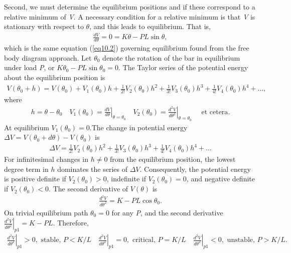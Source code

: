 \documentclass{AeroStructure-ERJohnson}
\begin{document}
\vspace*{-1pc}

Second, we must determine the equilibrium positions and if these correspond to a relative minimum of \textit{V}. A necessary condition for a relative minimum is that \textit{V} is stationary with respect to $\theta$, and this leads to equilibrium. That is,
\begin{align}\label{eq10.28}
\frac{d V}{d \theta}=0=K \theta-P L \sin \theta,
\end{align}
which is the same equation (\ref{eq10.2}) governing equilibrium found from the free body diagram approach. Let $\theta_{0}$ denote the rotation of the bar in equilibrium under load \textit{P}, or $K \theta_{0}-P L \sin \theta_{0}=0$. The Taylor series of the potential energy about the equilibrium position is
\begin{align}\label{eq10.29}
V\left(\theta_{0}+h\right)=V\left(\theta_{0}\right)+V_{1}\left(\theta_{0}\right) h+\frac{1}{2 !} V_{2}\left(\theta_{0}\right) h^{2}+\frac{1}{3 !} V_{3}\left(\theta_{0}\right) h^{3}+\frac{1}{4 !} V_{4}\left(\theta_{0}\right) h^{4}+\ldots,
\end{align}
where
\begin{align}\label{eq10.30}
h=\theta-\theta_{0} \quad V_{1}\left(\theta_{0}\right)=\left.\frac{d V}{d \theta}\right|_{\theta = \theta_{0}} \quad V_{2}\left(\theta_{0}\right)=\left.\frac{d^{2} V}{d \theta^{2}}\right|_{\theta = \theta_{0}} \quad \text { et cetera}.
\end{align}
At equilibrium $V_{1}\left(\theta_{0}\right)=0$.The change in potential energy $\Delta V=V\left(\theta_{0}+d \theta\right)-V\left(\theta_{0}\right)$ is
\begin{align}\label{eq10.31}
\Delta V=\frac{1}{2 !} V_{2}\left(\theta_{0}\right) h^{2}+\frac{1}{3 !} V_{3}\left(\theta_{0}\right) h^{3}+\frac{1}{4 !} V_{4}\left(\theta_{0}\right) h^{4}+\ldots
\end{align}
For infinitesimal changes in $h \neq 0$ from the equilibrium position, the lowest degree term in $h$ dominates the series of $\Delta V$. Consequently, the potential energy is positive definite if $V_{2}\left(\theta_{0}\right)>0$, indefinite if $V_{2}\left(\theta_{0}\right)=0$, and negative definite if $V_{2}\left(\theta_{0}\right)<0$. The second derivative of $V(\theta)$ is
\begin{align}\label{eq10.32}
\frac{d^{2} V}{d \theta^{2}}=K-P L \cos \theta_{0}.
\end{align}
On trivial equilibrium path $\theta_{0}=0$ for any \textit{P}, and the second derivative $\left.\frac{d^{2} V}{d \theta^{2}}\right|_{p 1}=K-P L$. Therefore,
\begin{align}\label{eq10.33}
\left.\frac{d^{2} V}{d \theta^{2}}\right|_{p 1}>0, \text { stable, } P<K /\left.L \quad \frac{d^{2} V}{d \theta^{2}}\right|_{p 1}=0, \text { critical, } P=K /\left.L \quad \frac{d^{2} V}{d \theta^{2}}\right|_{p 1}<0, \text { unstable, } P>K / L.
\end{align}
\end{document}
